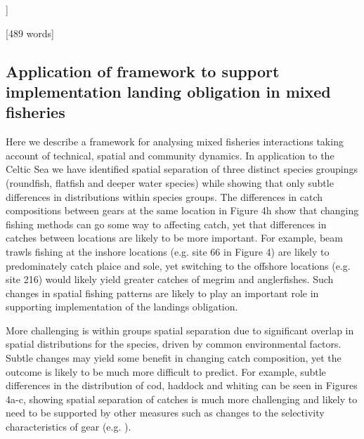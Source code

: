 \documentclass{nature}
\begin{document}
\begin{linenumbers}
[[WORK IN PROGRESS, NOT SURE WHETHER TO KEEP OR DEVELOP...	

Figure 5 shows the joint production function for the entire spatial domain,
giving the global production sets for the years 2011 - 2015. It gives the space
in which vessels have to operate where they can change the relative composition
of each species in the catch as a function of changing location fished only.
The convex hull of the space is the flexibility vessels have in order to adapt
to the changing fishing opportunities given the association of species with
each other\cite{Reimer2017}. As can be seen from Figure 5a which shows the
trade-off between cod and haddock for an Otter trawler....

Figure 5b shows the same for plaice and sole for a Beam trawler...
STRUGGLING TO DEFINE WHAT IS 'LOTS' AND WHAT IS 'LITTLE' SPACE
OBJECTIVELY...?]]

[489 words]

\subsection{Application of framework to support implementation landing
	obligation in mixed fisheries}
Here we describe a framework for analysing mixed fisheries interactions taking
account of technical, spatial and community dynamics. In application to the
Celtic Sea we have identified spatial separation of three distinct species
groupings (roundfish, flatfish and deeper water species) while showing that
only subtle differences in distributions within species groups. The differences
in catch compositions between gears at the same location in Figure 4h show that
changing fishing methods can go some way to affecting catch, yet that
differences in catches between locations are likely to be more important. For
example, beam trawls fishing at the inshore locations (e.g. site 66 in Figure
4) are likely to predominately catch plaice and sole, yet switching to the
offshore locations (e.g. site 216) would likely yield greater catches of megrim
and anglerfishes. Such changes in spatial fishing patterns are likely to play
an important role in supporting implementation of the landings obligation.

More challenging is within groups spatial separation due to significant overlap
in spatial distributions for the species, driven by common environmental
factors. Subtle changes may yield some benefit in changing catch composition,
yet the outcome is likely to be much more difficult to predict. For example,
subtle differences in the distribution of cod, haddock and whiting can be seen
in Figures 4a-c, showing spatial separation of catches is much more challenging
and likely to need to be supported by other measures such as changes to the
selectivity characteristics of gear (e.g. \cite{Santos2016}). 


\end{linenumbers}
\end{document}
